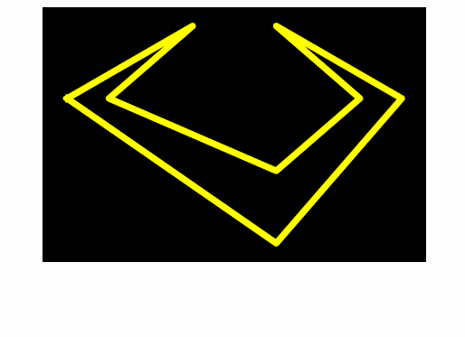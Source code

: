 \begin{definition}
\setlength{\intextsep}{0pt}%
\setlength{\columnsep}{3pt}%
\begin{figure}
\includegraphics[width=\linewidth]{src/callout/claw_t.png} 
\end{figure}
\small
\textcolor{white}{
We’d then take that to a blue box [which used the
FORTH programming language] for debugging. We’d mark changes to the code on a
listing, give it back to the typists who’d edit our files and give us a new
tape. Repeat ad infinitum.
}
\end{definition}

